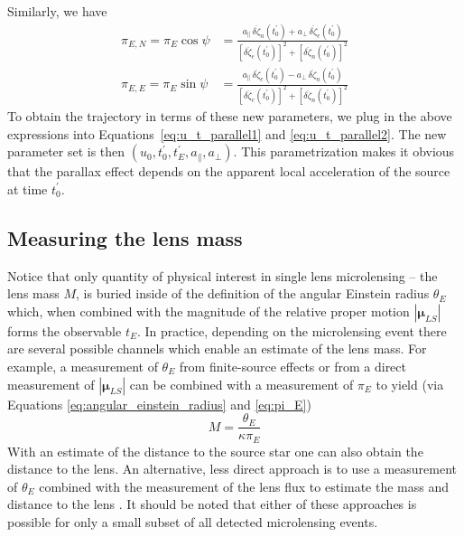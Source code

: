 \documentclass[12pt,dvipsnames]{report}
\begin{document}
Similarly, we have
\begin{align}
    \pi_{E,N}=\pi_E\cos\psi & = \frac{a_\parallel\,\delta\ddot{\zeta}_n(t_0^\prime) + a_\bot\,\delta\ddot{\zeta}_e(t_0^\prime)
    }{[\delta\ddot{\zeta}_e(t_0^\prime)]^2 + [\delta\ddot{\zeta}_n(t_0^\prime)]^2}                                              \\
    \pi_{E,E}=\pi_E\sin\psi & = \frac{ a_\parallel\,\delta\ddot{\zeta}_e(t_0^\prime) - a_\bot\,\delta\ddot{\zeta}_n(t_0^\prime)
    }{[\delta\ddot{\zeta}_e(t_0^\prime)]^2 + [\delta\ddot{\zeta}_n(t_0^\prime)]^2}
\end{align}
To obtain the trajectory in terms of these new parameters, we plug in the above expressions
into Equations~\ref{eq:u_t_parallel1} and \ref{eq:u_t_parallel2}.
The new parameter set is then $\left(u_0,t_0^\prime,t_E^\prime,a_\parallel,a_\bot\right)$. This parametrization makes it obvious that the parallax
effect depends on the apparent local acceleration of the source at time $t_0^\prime$.

\subsection{Measuring the lens mass}
Notice that only quantity of physical interest in single lens microlensing --
the lens mass $M$, is buried inside of the definition of the angular Einstein
radius $\theta_E$ which, when combined with the magnitude of the relative
proper motion $|\boldsymbol\mu_{LS}|$ forms the observable $t_E$. In practice,
depending on the microlensing event there are several possible channels which
enable an estimate of the lens mass. For example, a measurement of $\theta_E$
from finite-source effects or from a direct measurement of
$|\boldsymbol\mu_{LS}|$ can be combined with a measurement of $\pi_E$ to yield
(via Equations \ref{eq:angular_einstein_radius} and \ref{eq:pi_E})
\begin{equation}
    M = \frac{\theta_E}{\kappa \pi_E}
\end{equation}
With an estimate of the distance to the source star one can also obtain the distance
to the lens.
An alternative, less direct approach is to use a measurement of $\theta_E$ combined
with the measurement of the lens flux to estimate the mass and distance to the lens
\citep{2007ApJ...660..781B}.
It should be noted that either of these approaches is possible for only a small subset
of all detected microlensing events.
\end{document}
